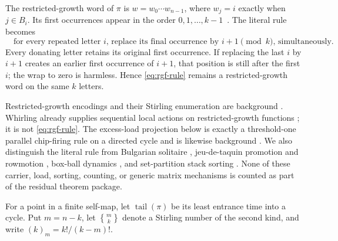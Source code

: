 \documentclass[a4paper,10pt]{amsart}
\theoremstyle{definition}
\theoremstyle{remark}
\newcommand{\tail}{\operatorname{tail}}
\newcommand{\Stirling}[2]{\genfrac\{\}{0pt}{}{#1}{#2}}
\begin{document}
The restricted-growth word of $\pi$ is $w=w_0\cdots w_{n-1}$, where
$w_j=i$ exactly when $j\in B_i$.  Its first occurrences appear in the order
$0,1,\ldots,k-1$ \,\cite{Wachs1994}.  The literal rule becomes
\begin{equation}\label{eq:rgf-rule}
 \boxed{\quad\text{for every repeated letter $i$, replace its final
 occurrence by $i+1\pmod{k}$, simultaneously.}\quad}
\end{equation}
Every donating letter retains its original first occurrence.  If replacing
the last $i$ by $i+1$ creates an earlier first occurrence of $i+1$, that
position is still after the first $i$; the wrap to zero is harmless.  Hence
\eqref{eq:rgf-rule} remains a restricted-growth word on the same $k$ letters.

Restricted-growth encodings and their Stirling enumeration are background
\cite{Wachs1994}.  Whirling already supplies sequential local actions on
restricted-growth functions \cite{JosephProppRoby2025}; it is not
\eqref{eq:rgf-rule}.  The excess-load projection below is exactly a
threshold-one parallel chip-firing rule on a directed cycle and is likewise
background \cite{JiLiWang2025}.  We also distinguish the literal rule from
Bulgarian solitaire \cite{Brandt1982}, jeu-de-taquin promotion and rowmotion
\cite{Schutzenberger1972,StrikerWilliams2012}, box-ball dynamics
\cite{TakahashiSatsuma1990}, and set-partition stack sorting
\cite{ChoiEtAl2024}.  None of these carrier, load, sorting, counting, or
generic matrix mechanisms is counted as part of the residual theorem package.

For a point in a finite self-map, let $\tail(\pi)$ be its least entrance time
into a cycle.  Put $m=n-k$, let $\Stirling{m}{k}$ denote a Stirling number of
the second kind, and write $(k)_m=k!/(k-m)!$.
\end{document}
